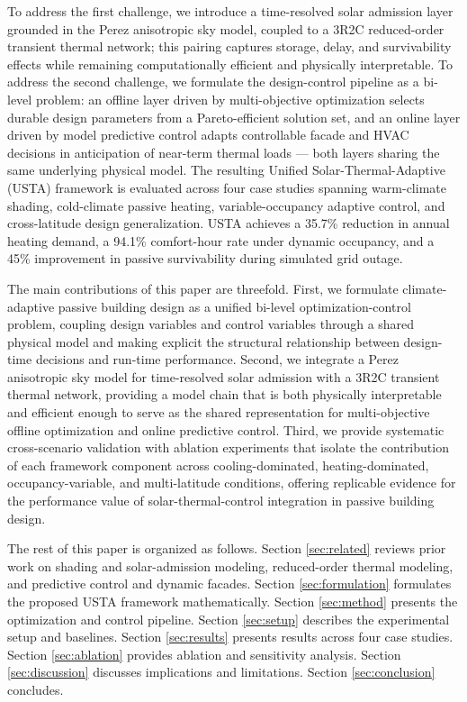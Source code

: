 \documentclass[preprint,12pt]{elsarticle}
\begin{document}
To address the first challenge, we introduce a time-resolved solar admission layer grounded in the Perez anisotropic sky model, coupled to a 3R2C reduced-order transient thermal network; this pairing captures storage, delay, and survivability effects while remaining computationally efficient and physically interpretable. To address the second challenge, we formulate the design-control pipeline as a bi-level problem: an offline layer driven by multi-objective optimization selects durable design parameters from a Pareto-efficient solution set, and an online layer driven by model predictive control adapts controllable facade and HVAC decisions in anticipation of near-term thermal loads --- both layers sharing the same underlying physical model. The resulting Unified Solar-Thermal-Adaptive (USTA) framework is evaluated across four case studies spanning warm-climate shading, cold-climate passive heating, variable-occupancy adaptive control, and cross-latitude design generalization. USTA achieves a 35.7\% reduction in annual heating demand, a 94.1\% comfort-hour rate under dynamic occupancy, and a 45\% improvement in passive survivability during simulated grid outage.

The main contributions of this paper are threefold. First, we formulate climate-adaptive passive building design as a unified bi-level optimization-control problem, coupling design variables and control variables through a shared physical model and making explicit the structural relationship between design-time decisions and run-time performance. Second, we integrate a Perez anisotropic sky model for time-resolved solar admission with a 3R2C transient thermal network, providing a model chain that is both physically interpretable and efficient enough to serve as the shared representation for multi-objective offline optimization and online predictive control. Third, we provide systematic cross-scenario validation with ablation experiments that isolate the contribution of each framework component across cooling-dominated, heating-dominated, occupancy-variable, and multi-latitude conditions, offering replicable evidence for the performance value of solar-thermal-control integration in passive building design.

The rest of this paper is organized as follows. Section \ref{sec:related} reviews prior work on shading and solar-admission modeling, reduced-order thermal modeling, and predictive control and dynamic facades. Section \ref{sec:formulation} formulates the proposed USTA framework mathematically. Section \ref{sec:method} presents the optimization and control pipeline. Section \ref{sec:setup} describes the experimental setup and baselines. Section \ref{sec:results} presents results across four case studies. Section \ref{sec:ablation} provides ablation and sensitivity analysis. Section \ref{sec:discussion} discusses implications and limitations. Section \ref{sec:conclusion} concludes.
\end{document}
